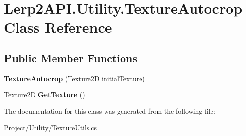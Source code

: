 \hypertarget{class_lerp2_a_p_i_1_1_utility_1_1_texture_autocrop}{}\section{Lerp2\+A\+P\+I.\+Utility.\+Texture\+Autocrop Class Reference}
\label{class_lerp2_a_p_i_1_1_utility_1_1_texture_autocrop}
\subsection*{Public Member Functions}
\begin{DoxyCompactItemize}
\item 
\mbox{\label{class_lerp2_a_p_i_1_1_utility_1_1_texture_autocrop_ae377d30d28f10ebd128dfccd0ac96c67}} 
{\bfseries Texture\+Autocrop} (Texture2D initial\+Texture)
\item 
\mbox{\label{class_lerp2_a_p_i_1_1_utility_1_1_texture_autocrop_a0732af109b4214f9b7afb341d42c7735}} 
Texture2D {\bfseries Get\+Texture} ()
\end{DoxyCompactItemize}


The documentation for this class was generated from the following file\+:\begin{DoxyCompactItemize}
\item 
Project/\+Utility/Texture\+Utils.\+cs\end{DoxyCompactItemize}
